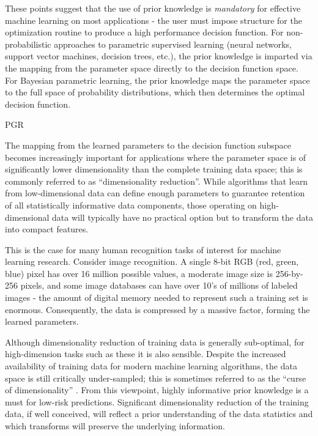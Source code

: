 \documentclass[12pt]{article}
\begin{document}
These points suggest that the use of prior knowledge is \emph{mandatory} for effective machine learning on most applications - the user must impose structure for the optimization routine to produce a high performance decision function. For non-probabilistic approaches to parametric supervised learning (neural networks, support vector machines, decision trees, etc.), the prior knowledge is imparted via the mapping from the parameter space directly to the decision function space. For Bayesian parametric learning, the prior knowledge maps the parameter space to the full space of probability distributions, which then determines the optimal decision function. 

PGR

The mapping from the learned parameters to the decision function subspace becomes increasingly important for applications where the parameter space is of significantly lower dimensionality than the complete training data space; this is commonly referred to as ``dimensionality reduction''. While algorithms that learn from low-dimensional data can define enough parameters to guarantee retention of all statistically informative data components, those operating on high-dimensional data will typically have no practical option but to transform the data into compact features. 

This is the case for many human recognition tasks of interest for machine learning research. Consider image recognition. A single 8-bit RGB (red, green, blue) pixel has over 16 million possible values, a moderate image size is 256-by-256 pixels, and some image databases can have over 10's of millions of labeled images - the amount of digital memory needed to represent such a training set is enormous. Consequently, the data is compressed by a massive factor, forming the learned parameters. 

Although dimensionality reduction of training data is generally sub-optimal, for high-dimension tasks such as these it is also sensible. Despite the increased availability of training data for modern machine learning algorithms, the data space is still critically under-sampled; this is sometimes referred to as the ``curse of dimensionality'' \cite{bellman}. From this viewpoint, highly informative prior knowledge is a must for low-risk predictions. Significant dimensionality reduction of the training data, if well conceived, will reflect a prior understanding of the data statistics and which transforms will preserve the underlying information. 
\end{document}
